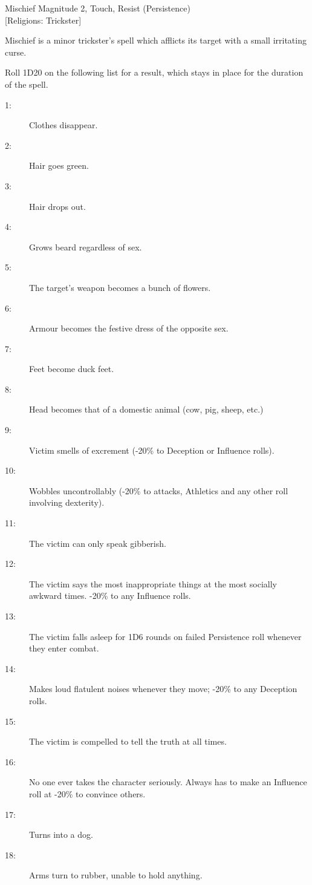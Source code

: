 \begin{rpg-spell}
{Mischief}
{Magnitude 2, Touch, Resist (Persistence)\\{[Religions: Trickster]}}

Mischief is a minor trickster’s spell which afflicts its target with a small irritating curse.

Roll 1D20 on the following list for a result, which stays in place for the duration of the spell.

\begin{description}
\item[1:] Clothes disappear.
\item[2:] Hair goes green.
\item[3:] Hair drops out.
\item[4:] Grows beard regardless of sex.
\item[5:] The target's weapon becomes a bunch of flowers.
\item[6:] Armour becomes the festive dress of the opposite sex.
\item[7:] Feet become duck feet.
\item[8:] Head becomes that of a domestic animal (cow, pig, sheep, etc.)
\item[9:] Victim smells of excrement (-20\% to Deception or Influence rolls).
\item[10:] Wobbles uncontrollably (-20\% to attacks, Athletics and any other roll involving dexterity).
\item[11:] The victim can only speak gibberish.
\item[12:] The victim says the most inappropriate things at the most socially awkward times. -20\% to any Influence rolls.
\item[13:] The victim falls asleep for 1D6 rounds on failed Persistence roll whenever they enter combat.
\item[14:] Makes loud flatulent noises whenever they move; -20\% to any Deception rolls.
\item[15:] The victim is compelled to tell the truth at all times.
\item[16:] No one ever takes the character seriously. Always has to make an Influence roll at -20\% to convince others.
\item[17:] Turns into a dog.
\item[18:] Arms turn to rubber, unable to hold anything.
\end{description}
\end{rpg-spell}



